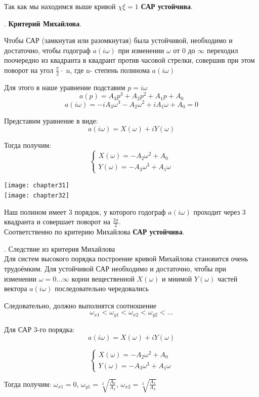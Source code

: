 \documentclass[12pt, a4paper]{report}
\begin{document}
Так как мы находимся выше кривой $ \chi\xi = 1 $ \textbf{САР устойчива}.

. \textbf{Критерий Михайлова}.

Чтобы САР (замкнутая или разомкнутая) была устойчивой, необходимо и достаточно, чтобы годограф $a(i\omega)$
при изменении $\omega$ от 0 до $ \infty $ переходил поочередно из квадранта в квадрант против часовой стрелки,
совершив при этом поворот на угол $\frac{\pi}{2}\cdot$ n, где n- степень полинома $a(i\omega)$

Для этого в наше уравнение подставим $ p = i\omega$
$$ a(p) = A_{3}p^{3} + A_{2}p^{2} + A_{1}p + A_{0} $$
$$ a(i\omega) = -iA_{3}\omega^{3} - A_{2}\omega^{2} + iA_{1}\omega + A_{0} = 0 $$

Представим уравнение в виде:
$$ a(i\omega) = X(\omega) + iY(\omega) $$

Тогда получим:
$$ \begin{cases}
        X(\omega) = -A_{2}\omega^{2} + A_{0} \\
        Y(\omega) = -A_{3}\omega^{3} + A_{1}\omega
        \end{cases}
$$

\texttt{[image: chapter31]}\\
\texttt{[image: chapter32]}

Наш полином имеет 3 порядок, у которого годограф $a(i\omega)$ проходит через 3 квадранта и совершает поворот на $ \frac{3\pi}{2} $.\\
Соответственно по критерию Михайлова \textbf{САР устойчива}.

. Следствие из критерия Михайлова\\
Для систем высокого порядка построение кривой Михайлова становится очень трудоёмким.
Для устойчивой САР необходимо и достаточно, чтобы при изменении $ \omega = 0\dots\infty $ корни вещественной $ X(\omega) $
и мнимой $ Y(\omega) $ частей вектора $ a(i\omega) $ последовательно чередовались

Следовательно, должно выполнятся соотношение
$$ \omega_{x1} < \omega_{y1} < \omega_{x2} < \omega_{y2} < \dots $$

Для САР 3-го порядка:
$$ a(i\omega) = X(\omega) + iY(\omega) $$

$$ \begin{cases}
        X(\omega) = -A_{2}\omega^{2} + A_{0} \\
        Y(\omega) = -A_{3}\omega^{3} + A_{1}\omega
        \end{cases}
$$

Тогда получим:
$ \omega_{x1} = 0 $, $ \omega_{y1} = \sqrt[2]{\frac{A_{0}}{A_{2}}} $, $ \omega_{x2} = \sqrt[2]{\frac{A_{1}}{A_{3}}} $
\end{document}
